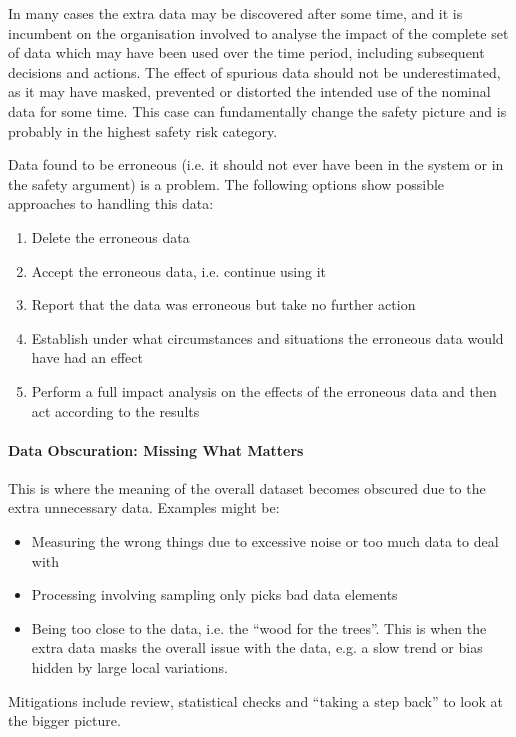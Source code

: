 In many cases the extra data may be discovered after some time, and it is incumbent on the organisation involved to analyse the impact of the complete set of data which may have been used over the time period, including subsequent decisions and actions. The effect of spurious data should not be underestimated, as it may have masked, prevented or distorted the intended use of the nominal data for some time. This case can fundamentally change the safety picture and is probably in the highest safety risk category.

Data found to be erroneous (i.e. it should not ever have been in the system or in the safety argument) is a problem. The following options show possible approaches to handling this data:
\begin{enumerate}[label=\color{dsiwgAccentColour}\roman*)]
    \item Delete the erroneous data
    \item Accept the erroneous data, i.e. continue using it
    \item Report that the data was erroneous but take no further action 
    \item Establish under what circumstances and situations the erroneous data would have had an effect
    \item Perform a full impact analysis on the effects of the erroneous data and then act according to the results
\end{enumerate}

\paragraph{Data Obscuration: Missing What Matters}
This is where the meaning of the overall \gls{dataset} becomes obscured due to the extra unnecessary data. Examples might be:
\begin{itemize}
    \item Measuring the wrong things due to excessive noise or too much data to deal with
    \item Processing involving sampling only picks bad data elements
    \item Being too close to the data, i.e. the ``wood for the trees''. This is when the extra data masks the overall issue with the data, e.g. a slow trend or bias hidden by large local variations.
\end{itemize}

Mitigations include review, statistical checks and ``taking a step back'' to look at the bigger picture.
